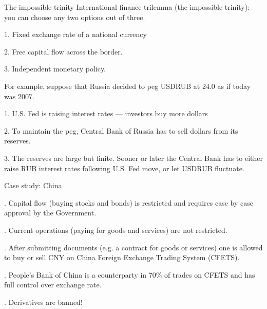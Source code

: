 \documentclass{beamer}
\begin{document}
\begin{frame}{The impossible trinity}
\justify
International finance trilemma (the impossible trinity): you can choose any two options out of three. 

1. Fixed exchange rate of a national currency

2. Free capital flow across the border.

3. Independent monetary policy.

\justify
For example, suppose that Russia decided to peg USDRUB at 24.0 as if today was 2007.

1. U.S. Fed is raising interest rates --- investors buy more dollars

2. To maintain the peg, Central Bank of Russia has to sell dollars from its reserves.

3. The reserves are large but finite. Sooner or later the Central Bank has to either raise RUB interest rates following U.S. Fed move, or let USDRUB fluctuate.

\end{frame}



\begin{frame}{Case study: China}

. Capital flow (buying stocks and bonds) is restricted and requires case by case approval by the Government.

. Current operations (paying for goods and services) are not restricted.

. After submitting documents (e.g. a contract for goods or services) one is allowed to buy or sell CNY on  China Foreign Exchange Trading System (CFETS).

. People's Bank of China is a counterparty in 70\% of trades on CFETS and has full control over exchange rate.

. Derivatives are banned!

\end{frame}
\end{document}
